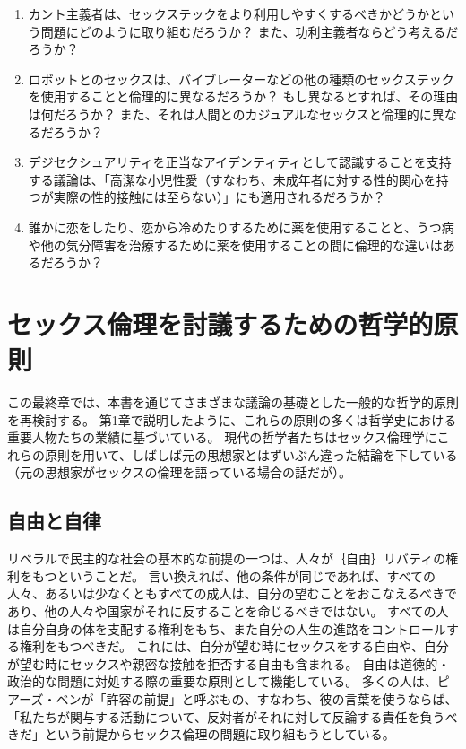 \documentclass[paper=a4,book,openany]{jlreq}
\begin{document}
\begin{enumerate}
 \item カント主義者は、セックステックをより利用しやすくするべきかどうかという問題にどのように取り組むだろうか？ また、功利主義者ならどう考えるだろうか？
 \item ロボットとのセックスは、バイブレーターなどの他の種類のセックステックを使用することと倫理的に異なるだろうか？ もし異なるとすれば、その理由は何だろうか？ また、それは人間とのカジュアルなセックスと倫理的に異なるだろうか？
 \item デジセクシュアリティを正当なアイデンティティとして認識することを支持する議論は、「高潔な小児性愛（すなわち、未成年者に対する性的関心を持つが実際の性的接触には至らない）」にも適用されるだろうか？
 \item 誰かに恋をしたり、恋から冷めたりするために薬を使用することと、うつ病や他の気分障害を治療するために薬を使用することの間に倫理的な違いはあるだろうか？
\end{enumerate}

\chapter{セックス倫理を討議するための哲学的原則}

この最終章では、本書を通じてさまざまな議論の基礎とした一般的な哲学的原則を再検討する。
第1章で説明したように、これらの原則の多くは哲学史における重要人物たちの業績に基づいている。
現代の哲学者たちはセックス倫理学にこれらの原則を用いて、しばしば元の思想家とはずいぶん違った結論を下している（元の思想家がセックスの倫理を語っている場合の話だが）。

\section{自由と自律}

リベラルで民主的な社会の基本的な前提の一つは、人々が｛自由｝{リバティ}の権利をもつということだ。
言い換えれば、他の条件が同じであれば、すべての人々、あるいは少なくともすべての成人は、自分の望むことをおこなえるべきであり、他の人々や国家がそれに反することを命じるべきではない。
すべての人は自分自身の体を支配する権利をもち、また自分の人生の進路をコントロールする権利をもつべきだ。
これには、自分が望む時にセックスをする自由や、自分が望む時にセックスや親密な接触を拒否する自由も含まれる。
自由は道徳的・政治的な問題に対処する際の重要な原則として機能している。
多くの人は、ピアーズ・ベンが「許容の前提」と呼ぶもの、すなわち、彼の言葉を使うならば、
「私たちが関与する活動について、反対者がそれに対して反論する責任を負うべきだ」\citep[p.237]{benn99:_is_sex_moral_special}という前提からセックス倫理の問題に取り組もうとしている。
\end{document}
